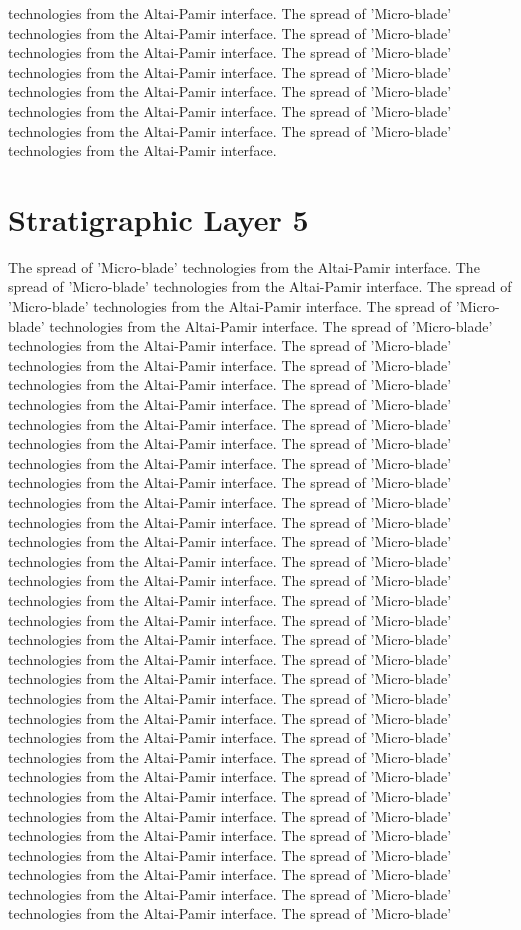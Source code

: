 technologies from the Altai-Pamir interface. The spread of 'Micro-blade' technologies from the Altai-Pamir interface. The spread of 'Micro-blade' technologies from the Altai-Pamir interface. The spread of 'Micro-blade' technologies from the Altai-Pamir interface. The spread of 'Micro-blade' technologies from the Altai-Pamir interface. The spread of 'Micro-blade' technologies from the Altai-Pamir interface. The spread of 'Micro-blade' technologies from the Altai-Pamir interface. The spread of 'Micro-blade' technologies from the Altai-Pamir interface. 

\section{Stratigraphic Layer 5}
The spread of 'Micro-blade' technologies from the Altai-Pamir interface. The spread of 'Micro-blade' technologies from the Altai-Pamir interface. The spread of 'Micro-blade' technologies from the Altai-Pamir interface. The spread of 'Micro-blade' technologies from the Altai-Pamir interface. The spread of 'Micro-blade' technologies from the Altai-Pamir interface. The spread of 'Micro-blade' technologies from the Altai-Pamir interface. The spread of 'Micro-blade' technologies from the Altai-Pamir interface. The spread of 'Micro-blade' technologies from the Altai-Pamir interface. The spread of 'Micro-blade' technologies from the Altai-Pamir interface. The spread of 'Micro-blade' technologies from the Altai-Pamir interface. The spread of 'Micro-blade' technologies from the Altai-Pamir interface. The spread of 'Micro-blade' technologies from the Altai-Pamir interface. The spread of 'Micro-blade' technologies from the Altai-Pamir interface. The spread of 'Micro-blade' technologies from the Altai-Pamir interface. The spread of 'Micro-blade' technologies from the Altai-Pamir interface. The spread of 'Micro-blade' technologies from the Altai-Pamir interface. The spread of 'Micro-blade' technologies from the Altai-Pamir interface. The spread of 'Micro-blade' technologies from the Altai-Pamir interface. The spread of 'Micro-blade' technologies from the Altai-Pamir interface. The spread of 'Micro-blade' technologies from the Altai-Pamir interface. The spread of 'Micro-blade' technologies from the Altai-Pamir interface. The spread of 'Micro-blade' technologies from the Altai-Pamir interface. The spread of 'Micro-blade' technologies from the Altai-Pamir interface. The spread of 'Micro-blade' technologies from the Altai-Pamir interface. The spread of 'Micro-blade' technologies from the Altai-Pamir interface. The spread of 'Micro-blade' technologies from the Altai-Pamir interface. The spread of 'Micro-blade' technologies from the Altai-Pamir interface. The spread of 'Micro-blade' technologies from the Altai-Pamir interface. The spread of 'Micro-blade' technologies from the Altai-Pamir interface. The spread of 'Micro-blade' technologies from the Altai-Pamir interface. The spread of 'Micro-blade' technologies from the Altai-Pamir interface. The spread of 'Micro-blade' technologies from the Altai-Pamir interface. The spread of 'Micro-blade' technologies from the Altai-Pamir interface. The spread of 'Micro-blade' technologies from the Altai-Pamir interface. The spread of 'Micro-blade' 